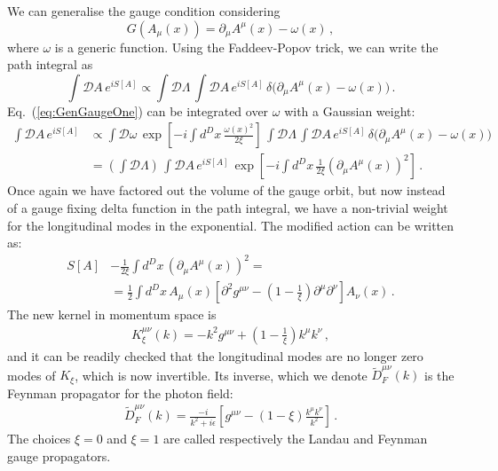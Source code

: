 \documentclass[notes]{subfiles}
\renewcommand{\munu}{{\mu\nu}}
\begin{document}
We can generalise the gauge condition considering
\begin{equation}
  \label{eq:GenGauge}
  G\left(A_\mu(x)\right) = \partial_\mu A^\mu(x) - \omega(x)\, ,
\end{equation}
where $\omega$ is a generic function. Using the Faddeev-Popov trick,
we can write the path integral as
\begin{equation}
  \label{eq:GenGaugeOne}
  \int \mathcal{D}A\, e^{i S[A]} 
  \propto \int \mathcal{D}\Lambda\, 
    \int \mathcal{D}A\,  e^{i S[A]} \, \delta\Big(
        \partial_\mu A^\mu(x) - \omega(x)
      \Big) \, .
\end{equation}
Eq.~(\ref{eq:GenGaugeOne}) can be integrated over $\omega$ with a
Gaussian weight:
\begin{align}
   \int \mathcal{D}A\, e^{i S[A]} 
  &\propto \int \mathcal{D}\omega\, \exp \left[
    -i \int d^Dx\, \frac{\omega(x)^2}{2\xi}
    \right]\, 
    \int \mathcal{D}\Lambda\, 
    \int \mathcal{D}A\,  e^{i S[A]} \, \delta\Big(
        \partial_\mu A^\mu(x) - \omega(x)
      \Big) \nonumber \\
  &= \left(\int \mathcal{D}\Lambda\right)\, 
    \int \mathcal{D}A\,  e^{i S[A]} \, 
    \exp \left[
    -i \int d^Dx\, \frac{1}{2\xi}
    \left(\partial_\mu A^\mu(x)\right)^2
    \right]\, .
\end{align}
Once again we have factored out the volume of the gauge orbit, but now
instead of a gauge fixing delta function in the path integral, we have
a non-trivial weight for the longitudinal modes in the
exponential. The modified action can be written as:
 \begin{align}
   S[A] &- \frac{1}{2\xi} \int d^Dx\, \left(
          \partial_\mu A^\mu(x) 
          \right)^2 = \nonumber \\
   &= \frac12 \int d^Dx\, 
     A_\mu(x) \left[
     \partial^2 g^\munu -
     \left(1-\frac{1}{\xi}\right) \partial^\mu\partial^\nu 
     \right] A_\nu(x)\, .
 \end{align}
The new kernel in momentum space is
\begin{align}
  K_\xi^\munu(k) =-k^2 g^\munu + \left(1-\frac{1}{\xi}\right) k^\mu
  k^\nu\, ,
\end{align}
and it can be readily checked that the longitudinal modes are no
longer zero modes of $K_\xi$, which is now invertible. Its inverse,
which we denote $\tilde{D}_F^\munu(k)$ is the Feynman propagator for
the photon field: 
\begin{align}
  \tilde{D}_F^\munu(k) = \frac{-i}{k^2+i\epsilon} 
  \left[
  g^\munu - \left(1-\xi\right)\frac{k^\mu k^\nu}{k^2}
  \right]\, .
\end{align}
The choices $\xi=0$ and $\xi=1$ are called respectively the Landau and
Feynman gauge propagators.
\end{document}
